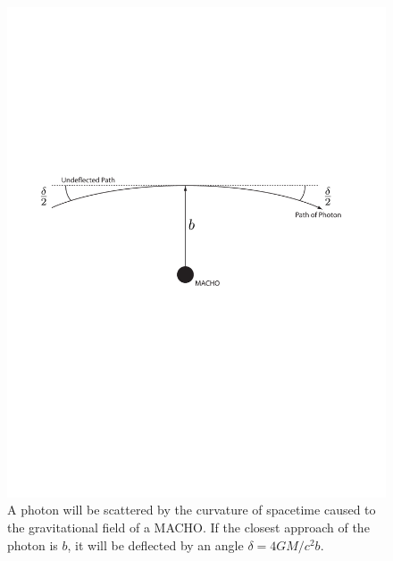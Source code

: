\begin{figure}[p]
\label{f:scattering}
\begin{center}
\includegraphics[width=\linewidth]{figures/macho/scattering}
\end{center}
\caption[Scattering of Light in Schwarzschild Spacetime]{%
A photon will be scattered by the curvature of spacetime caused to the
gravitational field of a MACHO. If the closest approach of the photon is 
$b$, it will be deflected by an angle $\delta = 4GM / c^2 b$.
}
\end{figure}

